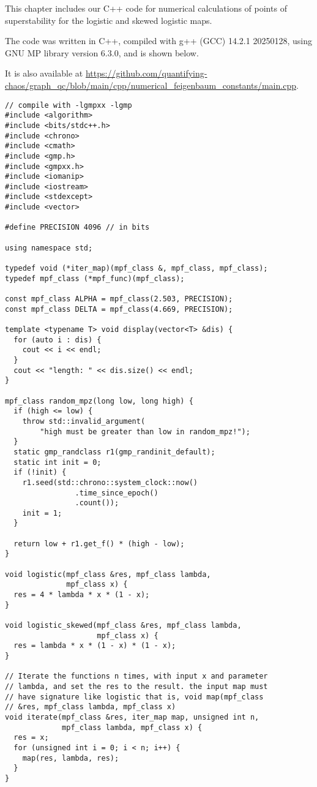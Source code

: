 This chapter includes our C++ code for numerical calculations of points of superstability for the logistic and skewed logistic maps.

The code was written in C++, compiled with g++ (GCC) 14.2.1 20250128, using GNU MP library version 6.3.0, and is shown below. 

It is also available at \url{https://github.com/quantifying-chaos/graph_qc/blob/main/cpp/numerical_feigenbaum_constants/main.cpp}.

\begin{lstlisting}[style=cppstyle]
// compile with -lgmpxx -lgmp
#include <algorithm>
#include <bits/stdc++.h>
#include <chrono>
#include <cmath>
#include <gmp.h>
#include <gmpxx.h>
#include <iomanip>
#include <iostream>
#include <stdexcept>
#include <vector>

#define PRECISION 4096 // in bits

using namespace std;

typedef void (*iter_map)(mpf_class &, mpf_class, mpf_class);
typedef mpf_class (*mpf_func)(mpf_class);

const mpf_class ALPHA = mpf_class(2.503, PRECISION);
const mpf_class DELTA = mpf_class(4.669, PRECISION);

template <typename T> void display(vector<T> &dis) {
  for (auto i : dis) {
    cout << i << endl;
  }
  cout << "length: " << dis.size() << endl;
}

mpf_class random_mpz(long low, long high) {
  if (high <= low) {
    throw std::invalid_argument(
        "high must be greater than low in random_mpz!");
  }
  static gmp_randclass r1(gmp_randinit_default);
  static int init = 0;
  if (!init) {
    r1.seed(std::chrono::system_clock::now()
                .time_since_epoch()
                .count());
    init = 1;
  }

  return low + r1.get_f() * (high - low);
}

void logistic(mpf_class &res, mpf_class lambda,
              mpf_class x) {
  res = 4 * lambda * x * (1 - x);
}

void logistic_skewed(mpf_class &res, mpf_class lambda,
                     mpf_class x) {
  res = lambda * x * (1 - x) * (1 - x);
}

// Iterate the functions n times, with input x and parameter
// lambda, and set the res to the result. the input map must
// have signature like logistic that is, void map(mpf_class
// &res, mpf_class lambda, mpf_class x)
void iterate(mpf_class &res, iter_map map, unsigned int n,
             mpf_class lambda, mpf_class x) {
  res = x;
  for (unsigned int i = 0; i < n; i++) {
    map(res, lambda, res);
  }
}


\end{lstlisting}
